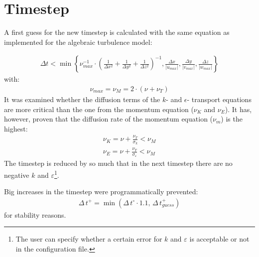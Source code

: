 \newpage
\section*{Timestep}
A first guess for the new timestep is calculated with the same equation as implemented for the algebraic turbulence model:

\begin{align}
\Delta t < \min\left\lbrace
\nu_{max}^{-1}\cdot
\left( 
\frac{1}{\Delta x^2}+
\frac{1}{\Delta y^2}+
\frac{1}{\Delta z^2}
\right)^{-1}
,
\frac{\Delta x}{|u_{max}|},
\frac{\Delta y}{|v_{max}|},
\frac{\Delta z}{|w_{max}|}
\right\rbrace
\end{align}
with:
\begin{align}
\nu_{max}=\nu_M = 2\cdot\left( \nu+\nu_T \right)
\end{align}
It was examined whether the diffusion terms of the $k$- and $\epsilon$- transport equations are more critical than the one from the momentum equation ($\nu_K$ and $\nu_E$). It has, however, proven that the diffusion rate of the momentum equation ($\nu_m$) is the highest:
\begin{align}
\nu_K = \nu+\frac{\nu_T}{\sigma_k}<\nu_M\\
\nu_E = \nu+\frac{\nu_T}{\sigma_\varepsilon}<\nu_M
\end{align}
The timestep is reduced by so much that in the next timestep there are no negative $k$ and $\varepsilon$\footnote{The user can specify whether a certain error for $k$ and $\varepsilon$ is acceptable or not in the configuration file.}.

\noii Big increases in the timestep were programmatically prevented:
\begin{align*}
\Delta\,t^+=\min{(\Delta\,t^\circ\cdot 1.1,\,\Delta\,t^+_{guess})}
\end{align*} 
for stability reasons.

\newpage
